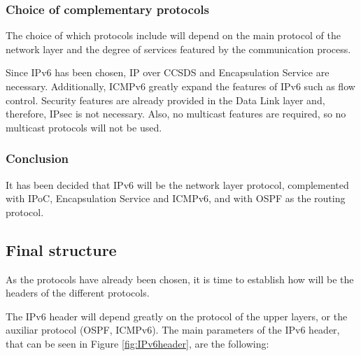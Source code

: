 \subsubsection{Choice of complementary protocols}
The choice of which protocols include will depend on the main protocol of the network layer and the degree of services featured by the communication process.

Since IPv6 has been chosen, IP over CCSDS and Encapsulation Service are necessary. Additionally, ICMPv6 greatly expand the features of IPv6 such as flow control. Security features are already provided in the Data Link layer and, therefore, IPsec is not necessary. Also, no multicast features are required, so no multicast protocols will not be used.

\subsubsection{Conclusion}
It has been decided that IPv6 will be the network layer protocol, complemented with IPoC, Encapsulation Service and ICMPv6, and with OSPF as the routing protocol.

\subsection{Final structure}
As the protocols have already been chosen, it is time to establish how will be the headers of the different protocols.

The IPv6 header will depend greatly on the protocol of the upper layers, or the auxiliar protocol (OSPF, ICMPv6). The main parameters of the IPv6 header, that can be seen in Figure \ref{fig:IPv6header}, are the following:

